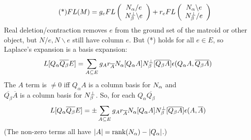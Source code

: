 \documentclass{beamer}
\begin{document}
\begin{frame}
    \begin{equation*}\tag{*}
  FL(M) =
  g_eFL\left(\begin{array}{c} N_{\alpha}/e\\ N_{\beta}^{\perp}\backslash e \end{array} \right)
+
r_eFL\left(\begin{array}{c} N_{\alpha}\backslash e\\ N_{\beta}^{\perp}/e \end{array} \right)
    \end{equation*}
Real deletion/contraction removes $e$ from the ground set of the matroid or other
object, but $N/e,N\backslash e$ still have column $e$.  But (*) holds for all $e\in E$, so
Laplace's expansion is
a basis expansion:
\[
L[Q_\alpha \overline{Q_\beta} E] = \sum_{A\subseteq E}g_Ar_{\overline{A}}N_{\alpha}[Q_\alpha A]N_{\beta}^{\perp}[\overline{Q_\beta}\overline{A}]
\epsilon(Q_\alpha A,\overline{Q_\beta}\overline{A})
\]
The $A$ term is $\neq 0$ iff $Q_\alpha A$ is a column basis for $N_{\alpha}$ and \\
$\overline{Q_\beta} \overline{A}$ is a column basis for $N_{\beta}^{\perp}$.
So, for each $Q_\alpha \overline{Q_\beta} $
\[
L[Q_\alpha \overline{Q_\beta} E] =
\pm\sum_{A\subseteq E}g_Ar_{\overline{A}}N_{\alpha}[Q_\alpha A]N_{\beta}^{\perp}[\overline{Q_\beta}\overline{A}]
\epsilon(A,\overline{A})
\]
(The non-zero terms all have $|A|=\text{rank}(N_{\alpha})-|Q_\alpha|$.)
\end{frame}
\end{document}

